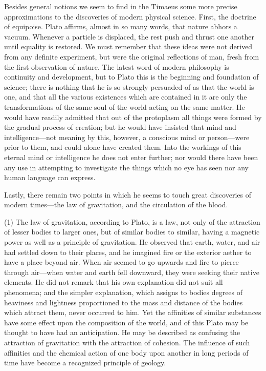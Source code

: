 Besides general notions we seem to find in the Timaeus some more precise
approximations to the discoveries of modern physical science. First, the
doctrine of equipoise. Plato affirms, almost in so many words, that nature
abhors a vacuum. Whenever a particle is displaced, the rest push and
thrust one another until equality is restored. We must remember that these
ideas were not derived from any definite experiment, but were the original
reflections of man, fresh from the first observation of nature. The latest
word of modern philosophy is continuity and development, but to Plato this
is the beginning and foundation of science; there is nothing that he is so
strongly persuaded of as that the world is one, and that all the various
existences which are contained in it are only the transformations of the
same soul of the world acting on the same matter. He would have readily
admitted that out of the protoplasm all things were formed by the gradual
process of creation; but he would have insisted that mind and intelligence—not
meaning by this, however, a conscious mind or person—were prior to
them, and could alone have created them. Into the workings of this eternal
mind or intelligence he does not enter further; nor would there have been
any use in attempting to investigate the things which no eye has seen nor
any human language can express.

Lastly, there remain two points in which he seems to touch great
discoveries of modern times—the law of gravitation, and the
circulation of the blood.

(1) The law of gravitation, according to Plato, is a law, not only of the
attraction of lesser bodies to larger ones, but of similar bodies to
similar, having a magnetic power as well as a principle of gravitation. He
observed that earth, water, and air had settled down to their places, and
he imagined fire or the exterior aether to have a place beyond air. When
air seemed to go upwards and fire to pierce through air—when water
and earth fell downward, they were seeking their native elements. He did
not remark that his own explanation did not suit all phenomena; and the
simpler explanation, which assigns to bodies degrees of heaviness and
lightness proportioned to the mass and distance of the bodies which
attract them, never occurred to him. Yet the affinities of similar
substances have some effect upon the composition of the world, and of this
Plato may be thought to have had an anticipation. He may be described as
confusing the attraction of gravitation with the attraction of cohesion.
The influence of such affinities and the chemical action of one body upon
another in long periods of time have become a recognized principle of
geology.

